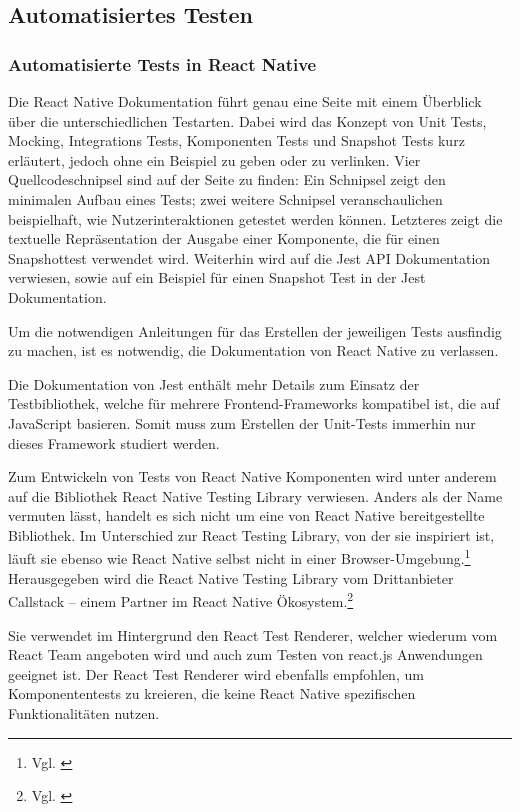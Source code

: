 
\subsection{Automatisiertes Testen}

\subsubsection{Automatisierte Tests in React Native} Die React Native Dokumentation führt genau eine Seite mit einem Überblick über die unterschiedlichen Testarten.
Dabei wird das Konzept von Unit Tests, Mocking, Integrations Tests, Komponenten Tests und Snapshot Tests kurz erläutert, jedoch ohne ein Beispiel zu geben oder zu verlinken.
Vier Quellcodeschnipsel sind auf der Seite zu finden: Ein Schnipsel zeigt den minimalen Aufbau eines Tests; zwei weitere Schnipsel veranschaulichen beispielhaft, wie Nutzerinteraktionen getestet werden können. Letzteres zeigt die textuelle Repräsentation der Ausgabe einer Komponente, die für einen Snapshottest verwendet wird.
Weiterhin wird auf die Jest API Dokumentation verwiesen, sowie auf ein Beispiel für einen Snapshot Test in der Jest Dokumentation.

Um die notwendigen Anleitungen für das Erstellen der jeweiligen Tests ausfindig zu machen, ist es notwendig, die Dokumentation von React Native zu verlassen.

Die Dokumentation von Jest enthält mehr Details zum Einsatz der Testbibliothek, welche für mehrere Frontend-Frameworks kompatibel ist, die auf JavaScript basieren. Somit muss zum Erstellen der Unit-Tests immerhin nur dieses Framework studiert werden.

Zum Entwickeln von Tests von React Native Komponenten wird unter anderem auf die Bibliothek React Native Testing Library verwiesen.
Anders als der Name vermuten lässt, handelt es sich nicht um eine von React Native bereitgestellte Bibliothek.
Im Unterschied zur React Testing Library, von der sie inspiriert ist, läuft sie  ebenso  wie React Native selbst nicht in einer Browser-Umgebung.\footnote{Vgl. \cite{NativeTestingLibraryIntroduction}} Herausgegeben wird die React Native Testing Library vom Drittanbieter Callstack -- einem Partner im React Native Ökosystem.\footnote{Vgl. \cite{TheReactNativeEcosystem}}

Sie verwendet im Hintergrund den React Test Renderer, welcher wiederum vom React Team angeboten wird und auch zum Testen von react.js Anwendungen geeignet ist. Der React Test Renderer wird ebenfalls empfohlen, um Komponententests zu kreieren, die keine React Native spezifischen Funktionalitäten nutzen.

